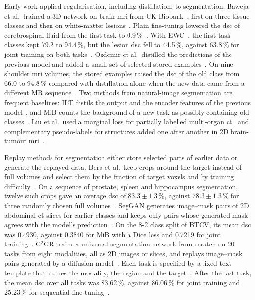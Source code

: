 Early work applied regularisation, including distillation, to segmentation.
Baweja et al.\ trained a 3D network on brain \gls{mri} from UK Biobank~\cite{ukbiobank}, first on three tissue classes and then on white-matter lesions~\cite{baweja2018continuallearningmedicalimaging}.
Plain fine-tuning lowered the \gls{dsc} of cerebrospinal fluid from the first task to 0.9\,\%~\cite{baweja2018continuallearningmedicalimaging}.
With EWC~\cite{Kirkpatrick_2017}, the first-task classes kept 79.2 to 94.4\,\%, but the lesion \gls{dsc} fell to 44.5\,\%, against 63.8\,\% for joint training on both tasks~\cite{baweja2018continuallearningmedicalimaging}.
Ozdemir et al.\ distilled the predictions of the previous model and added a small set of selected stored examples~\cite{Ozdemir_2018}.
On nine shoulder \gls{mri} volumes, the stored examples raised the \gls{dsc} of the old class from 66.0 to 94.8\,\% compared with distillation alone when the new data came from a different MR sequence~\cite{Ozdemir_2018}.
Two methods from natural-image segmentation are frequent baselines: ILT distils the output and the encoder features of the previous model~\cite{michieli2019incrementallearningtechniquessemantic}, and MiB counts the background of a new task as possibly containing old classes~\cite{cermelli2020modelingbackgroundincrementallearning}.
Liu et al.\ used a marginal loss for partially labelled multi-organ \gls{ct}~\cite{liu2022learningincrementallysegmentmultiple} and complementary pseudo-labels for structures added one after another in 2D brain-tumour \gls{mri}~\cite{liu2023incrementallearningheterogeneousstructure}.

Replay methods for segmentation either store selected parts of earlier data or generate the replayed data.
Bera et al.\ keep crops around the target instead of full volumes and select them by the fraction of target voxels and by training difficulty~\cite{memory_replay_cropping}.
On a sequence of prostate, spleen and hippocampus segmentation, twelve such crops gave an average \gls{dsc} of $83.3 \pm 1.3$\,\%, against $78.3 \pm 1.3$\,\% for three randomly chosen full volumes~\cite{memory_replay_cropping}.
SegGAN generates image--mask pairs of 2D abdominal \gls{ct} slices for earlier classes and keeps only pairs whose generated mask agrees with the model's prediction~\cite{newgenerativereplayapproach}.
On the 8-2 class split of BTCV, its mean \gls{dsc} was 0.4930, against 0.3840 for MiB with a Dice loss and 0.7219 for joint training~\cite{newgenerativereplayapproach}.
C$^2$GR trains a universal segmentation network from scratch on 20 tasks from eight modalities, all as 2D images or slices, and replays image--mask pairs generated by a diffusion model~\cite{li2026c2gr}.
Each task is specified by a fixed text template that names the modality, the region and the target~\cite{li2026c2gr}.
After the last task, the mean \gls{dsc} over all tasks was 83.62\,\%, against 86.06\,\% for joint training and 25.23\,\% for sequential fine-tuning~\cite{li2026c2gr}.

